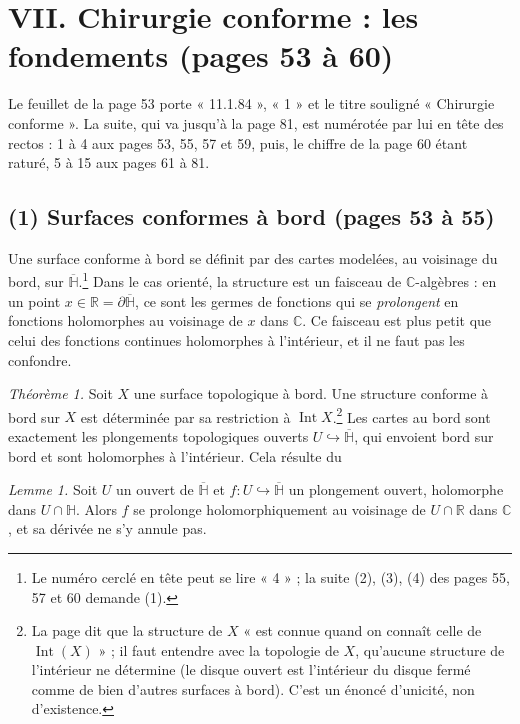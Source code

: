 \documentclass[11pt,a4paper]{article}
\begin{document}
\section*{VII. Chirurgie conforme : les fondements (pages 53 à 60)}

Le feuillet de la page 53 porte « 11.1.84 », « 1 » et le titre souligné
« Chirurgie conforme ». La suite, qui va jusqu'à la page 81, est numérotée
par lui en tête des rectos : 1 à 4 aux pages 53, 55, 57 et 59, puis, le
chiffre de la page 60 étant raturé, 5 à 15 aux pages 61 à 81.

\subsection*{(1) Surfaces conformes à bord (pages 53 à 55)}

Une surface conforme à bord se définit par des cartes modelées, au voisinage
du bord, sur $\overline{\mathbb{H}}$.\footnote{Le numéro cerclé en tête peut
se lire « 4 » ; la suite (2), (3), (4) des pages 55, 57 et 60 demande (1).}
Dans le cas orienté, la structure est un faisceau de $\mathbb{C}$-algèbres :
en un point $x \in \mathbb{R} = \partial\overline{\mathbb{H}}$, ce sont les
germes de fonctions qui se \emph{prolongent} en fonctions holomorphes au
voisinage de $x$ dans $\mathbb{C}$. Ce faisceau est plus petit que celui des
fonctions continues holomorphes à l'intérieur, et il ne faut pas les
confondre.

\emph{Théorème 1.} Soit $X$ une surface topologique à bord. Une structure
conforme à bord sur $X$ est déterminée par sa restriction à
$\operatorname{Int} X$.\footnote{La page dit que la structure de $X$ « est
connue quand on connaît celle de $\operatorname{Int}(X)$ » ; il faut entendre
avec la topologie de $X$, qu'aucune structure de l'intérieur ne détermine
(le disque ouvert est l'intérieur du disque fermé comme de bien d'autres
surfaces à bord). C'est un énoncé d'unicité, non d'existence.} Les cartes au
bord sont exactement les plongements topologiques ouverts
$U \hookrightarrow \overline{\mathbb{H}}$, qui envoient bord sur bord et sont
holomorphes à l'intérieur. Cela résulte du

\emph{Lemme 1.} Soit $U$ un ouvert de $\overline{\mathbb{H}}$ et
$f : U \hookrightarrow \overline{\mathbb{H}}$ un plongement ouvert,
holomorphe dans $U \cap \mathbb{H}$. Alors $f$ se prolonge holomorphiquement
au voisinage de $U \cap \mathbb{R}$ dans $\mathbb{C}$, et sa dérivée ne s'y
annule pas.
\end{document}
